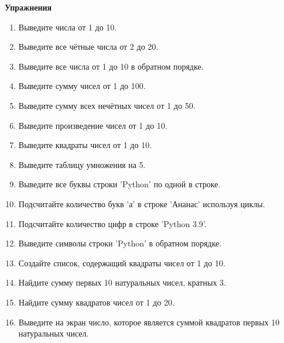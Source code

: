 \documentclass[a4,12pt]{article}
\theoremstyle{remark}
\begin{document}
\textbf{Упражнения}
\begin{enumerate}
    \subsection*{Базовые задачи (Простые задачи)}
    \item Выведите числа от 1 до 10.
    \item Выведите все чётные числа от 2 до 20.
    \item Выведите все числа от 1 до 10 в обратном порядке.
    \item Выведите сумму чисел от 1 до 100.
    \item Выведите сумму всех нечётных чисел от 1 до 50.
    \item Выведите произведение чисел от 1 до 10.
    \item Выведите квадраты чисел от 1 до 10.
    \item Выведите таблицу умножения на 5.
    \item Выведите все буквы строки 'Python' по одной в строке.
    \item Подсчитайте количество букв 'а' в строке 'Ананас' используя циклы.
    \item Подсчитайте количество цифр в строке 'Python 3.9'.
    \item Выведите символы строки 'Python' в обратном порядке.
    \item Создайте список, содержащий квадраты чисел от 1 до 10.
    \item Найдите сумму первых 10 натуральных чисел, кратных 3.
    \item Найдите сумму квадратов чисел от 1 до 20.
    \item Выведите на экран число, которое является суммой квадратов первых 10 натуральных чисел.

\end{enumerate}
\end{document}
